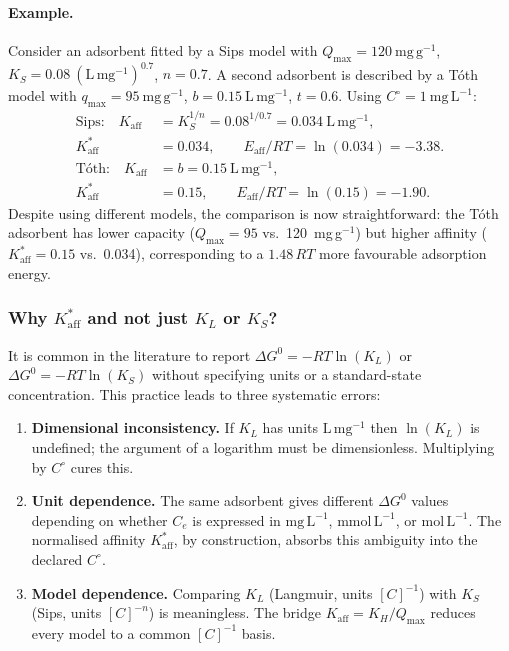 	\paragraph{Example.}
	Consider an adsorbent fitted by a Sips model with
	$Q_{\max} = 120~\mathrm{mg\,g^{-1}}$,
	$K_S = 0.08~\mathrm{(L\,mg^{-1})^{0.7}}$, $n = 0.7$.
	A second adsorbent is described by a T\'oth model with
	$q_{\max} = 95~\mathrm{mg\,g^{-1}}$,
	$b = 0.15~\mathrm{L\,mg^{-1}}$, $t = 0.6$.
	Using $C^\circ = 1~\mathrm{mg\,L^{-1}}$:
	\begin{align}
		\text{Sips:}\quad
		K_{\mathrm{aff}}
		&= K_S^{1/n} = 0.08^{1/0.7}
		= 0.034~\mathrm{L\,mg^{-1}},
		\nonumber\\
		K_{\mathrm{aff}}^{\ast} &= 0.034,
		\qquad
		E_{\mathrm{aff}} / RT = \ln(0.034) = -3.38.
		\nonumber\\[4pt]
		\text{T\'oth:}\quad
		K_{\mathrm{aff}}
		&= b = 0.15~\mathrm{L\,mg^{-1}},
		\nonumber\\
		K_{\mathrm{aff}}^{\ast} &= 0.15,
		\qquad
		E_{\mathrm{aff}} / RT = \ln(0.15) = -1.90.
	\end{align}
	Despite using different models, the comparison is now
	straightforward: the T\'oth adsorbent has lower capacity
	($Q_{\max} = 95$ vs.\ 120~mg\,g$^{-1}$) but higher affinity
	($K_{\mathrm{aff}}^{\ast} = 0.15$ vs.\ 0.034), corresponding to
	a $1.48\,RT$ more favourable adsorption energy.

	\subsubsection{Why $K_{\mathrm{aff}}^{\ast}$ and not just
		$K_L$ or $K_S$?}

	It is common in the literature to report $\Delta G^0 = -RT\ln(K_L)$
	or $\Delta G^0 = -RT\ln(K_S)$ without specifying units or a
	standard-state concentration.  This practice leads to three
	systematic errors:

	\begin{enumerate}
		\item \textbf{Dimensional inconsistency.}
		If $K_L$ has units $\mathrm{L\,mg^{-1}}$ then
		$\ln(K_L)$ is undefined; the argument of a logarithm must be
		dimensionless.  Multiplying by $C^\circ$ cures this.

		\item \textbf{Unit dependence.}
		The same adsorbent gives different $\Delta G^0$ values
		depending on whether $C_e$ is expressed in
		$\mathrm{mg\,L^{-1}}$, $\mathrm{mmol\,L^{-1}}$, or
		$\mathrm{mol\,L^{-1}}$.
		The normalised affinity $K_{\mathrm{aff}}^{\ast}$, by
		construction, absorbs this ambiguity into the declared
		$C^\circ$.

		\item \textbf{Model dependence.}
		Comparing $K_L$ (Langmuir, units $[C]^{-1}$) with
		$K_S$ (Sips, units $[C]^{-n}$) is meaningless.
		The bridge $K_{\mathrm{aff}} = K_H / Q_{\max}$ reduces
		every model to a common $[C]^{-1}$ basis.
	\end{enumerate}


